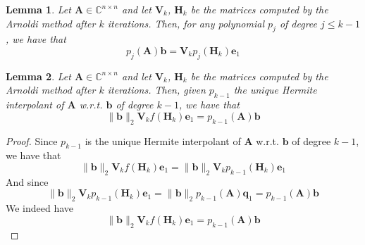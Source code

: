 \documentclass[11pt]{article}
\newtheorem{lemma}{Lemma}
\numberwithin{equation}{section}
\begin{document}
\begin{lemma}\label{lem:arnoldi2}
    Let $\mathbf{A}\in\mathbb{C}^{n\times n}$ and let $\mathbf{V}_k$, $\mathbf{H}_k$ be the matrices computed by the Arnoldi method after $k$ iterations. Then, for any polynomial $p_j$ of degree $j\leq k-1$, we have that
    \begin{equation}
        p_j(\mathbf{A})\mathbf{b} = \mathbf{V}_kp_j(\mathbf{H}_k)\mathbf{e}_1
    \end{equation}
\end{lemma}

\begin{lemma}\label{lem:arnoldi3}
    Let $\mathbf{A}\in\mathbb{C}^{n\times n}$ and let $\mathbf{V}_k$, $\mathbf{H}_k$ be the matrices computed by the Arnoldi method after $k$ iterations. Then, given $p_{k-1}$ the unique Hermite interpolant of $\mathbf{A}$ w.r.t. $\mathbf{b}$ of degree $k-1$, we have that
    \begin{equation}
        \|\mathbf{b}\|_2\mathbf{V}_k f(\mathbf{H}_k)\mathbf{e}_1 = p_{k-1}(\mathbf{A})\mathbf{b}
    \end{equation}
\end{lemma}
\begin{proof}
    Since $p_{k-1}$ is the unique Hermite interpolant of $\mathbf{A}$ w.r.t. $\mathbf{b}$ of degree $k-1$, we have that
    \begin{equation*}
        \|\mathbf{b}\|_2\mathbf{V}_k f(\mathbf{H}_k)\mathbf{e}_1 = \|\mathbf{b}\|_2\mathbf{V}_k p_{k-1}(\mathbf{H}_k)\mathbf{e}_1
    \end{equation*}
    And since 
    \begin{equation*}
        \|\mathbf{b}\|_2\mathbf{V}_k p_{k-1}(\mathbf{H}_k)\mathbf{e}_1 = \|\mathbf{b}\|_2p_{k-1}(\mathbf{A})\mathbf{q}_1 = p_{k-1}(\mathbf{A})\mathbf{b}
    \end{equation*}
    We indeed have
    \begin{equation*}
        \|\mathbf{b}\|_2\mathbf{V}_k f(\mathbf{H}_k)\mathbf{e}_1 = p_{k-1}(\mathbf{A})\mathbf{b}
    \end{equation*}
\end{proof}
\end{document}
